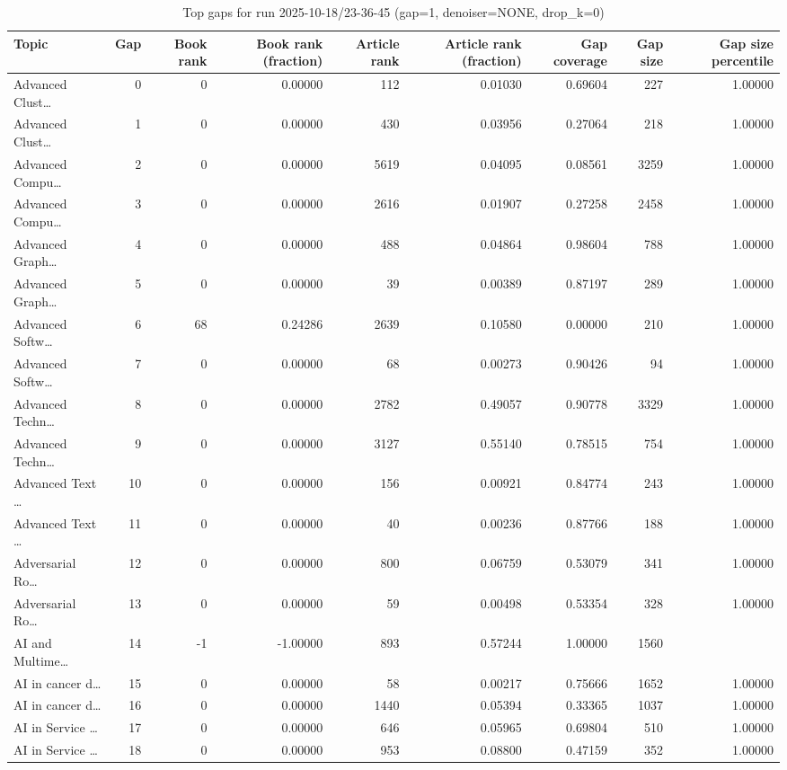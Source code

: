 \begin{table}
\caption{Top gaps for run 2025-10-18/23-36-45 (gap=1, denoiser=NONE, drop\_k=0)}
\label{tab:best_run_gap1_2025_10_18_23_36_45}
\begin{tabular}{lrrrrrrrr}
\toprule
Topic & Gap & Book rank & Book rank (fraction) & Article rank & Article rank (fraction) & Gap coverage & Gap size & Gap size percentile \\
\midrule
Advanced Clust… & 0 & 0 & 0.00000 & 112 & 0.01030 & 0.69604 & 227 & 1.00000 \\
Advanced Clust… & 1 & 0 & 0.00000 & 430 & 0.03956 & 0.27064 & 218 & 1.00000 \\
Advanced Compu… & 2 & 0 & 0.00000 & 5619 & 0.04095 & 0.08561 & 3259 & 1.00000 \\
Advanced Compu… & 3 & 0 & 0.00000 & 2616 & 0.01907 & 0.27258 & 2458 & 1.00000 \\
Advanced Graph… & 4 & 0 & 0.00000 & 488 & 0.04864 & 0.98604 & 788 & 1.00000 \\
Advanced Graph… & 5 & 0 & 0.00000 & 39 & 0.00389 & 0.87197 & 289 & 1.00000 \\
Advanced Softw… & 6 & 68 & 0.24286 & 2639 & 0.10580 & 0.00000 & 210 & 1.00000 \\
Advanced Softw… & 7 & 0 & 0.00000 & 68 & 0.00273 & 0.90426 & 94 & 1.00000 \\
Advanced Techn… & 8 & 0 & 0.00000 & 2782 & 0.49057 & 0.90778 & 3329 & 1.00000 \\
Advanced Techn… & 9 & 0 & 0.00000 & 3127 & 0.55140 & 0.78515 & 754 & 1.00000 \\
Advanced Text … & 10 & 0 & 0.00000 & 156 & 0.00921 & 0.84774 & 243 & 1.00000 \\
Advanced Text … & 11 & 0 & 0.00000 & 40 & 0.00236 & 0.87766 & 188 & 1.00000 \\
Adversarial Ro… & 12 & 0 & 0.00000 & 800 & 0.06759 & 0.53079 & 341 & 1.00000 \\
Adversarial Ro… & 13 & 0 & 0.00000 & 59 & 0.00498 & 0.53354 & 328 & 1.00000 \\
AI and Multime… & 14 & -1 & -1.00000 & 893 & 0.57244 & 1.00000 & 1560 &  \\
AI in cancer d… & 15 & 0 & 0.00000 & 58 & 0.00217 & 0.75666 & 1652 & 1.00000 \\
AI in cancer d… & 16 & 0 & 0.00000 & 1440 & 0.05394 & 0.33365 & 1037 & 1.00000 \\
AI in Service … & 17 & 0 & 0.00000 & 646 & 0.05965 & 0.69804 & 510 & 1.00000 \\
AI in Service … & 18 & 0 & 0.00000 & 953 & 0.08800 & 0.47159 & 352 & 1.00000 \\

\end{tabular}
\end{table}
